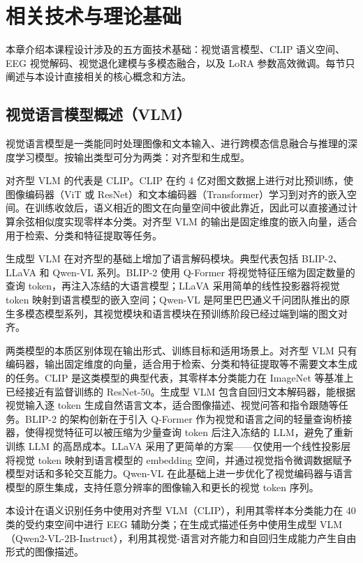 \section{相关技术与理论基础}

本章介绍本课程设计涉及的五方面技术基础：视觉语言模型、CLIP 语义空间、EEG 视觉解码、视觉退化建模与多模态融合，以及 LoRA 参数高效微调。每节只阐述与本设计直接相关的核心概念和方法。

\subsection{视觉语言模型概述（VLM）}

视觉语言模型是一类能同时处理图像和文本输入、进行跨模态信息融合与推理的深度学习模型。按输出类型可分为两类：对齐型和生成型。

对齐型 VLM 的代表是 CLIP。CLIP 在约 4 亿对图文数据上进行对比预训练，使图像编码器（ViT 或 ResNet）和文本编码器（Transformer）学习到对齐的嵌入空间。在训练收敛后，语义相近的图文在向量空间中彼此靠近，因此可以直接通过计算余弦相似度实现零样本分类。对齐型 VLM 的输出是固定维度的嵌入向量，适合用于检索、分类和特征提取等任务。

生成型 VLM 在对齐型的基础上增加了语言解码模块。典型代表包括 BLIP-2、LLaVA 和 Qwen-VL 系列。BLIP-2 使用 Q-Former 将视觉特征压缩为固定数量的查询 token，再注入冻结的大语言模型；LLaVA 采用简单的线性投影器将视觉 token 映射到语言模型的嵌入空间；Qwen-VL 是阿里巴巴通义千问团队推出的原生多模态模型系列，其视觉模块和语言模块在预训练阶段已经过端到端的图文对齐。

两类模型的本质区别体现在输出形式、训练目标和适用场景上。对齐型 VLM 只有编码器，输出固定维度的向量，适合用于检索、分类和特征提取等不需要文本生成的任务。CLIP 是这类模型的典型代表，其零样本分类能力在 ImageNet 等基准上已经接近有监督训练的 ResNet-50。生成型 VLM 包含自回归文本解码器，能根据视觉输入逐 token 生成自然语言文本，适合图像描述、视觉问答和指令跟随等任务。BLIP-2 的架构创新在于引入 Q-Former 作为视觉和语言之间的轻量查询桥接器，使得视觉特征可以被压缩为少量查询 token 后注入冻结的 LLM，避免了重新训练 LLM 的高昂成本。LLaVA 采用了更简单的方案——仅使用一个线性投影层将视觉 token 映射到语言模型的 embedding 空间，并通过视觉指令微调数据赋予模型对话和多轮交互能力。Qwen-VL 在此基础上进一步优化了视觉编码器与语言模型的原生集成，支持任意分辨率的图像输入和更长的视觉 token 序列。

本设计在语义识别任务中使用对齐型 VLM（CLIP），利用其零样本分类能力在 40 类的受约束空间中进行 EEG 辅助分类；在生成式描述任务中使用生成型 VLM（Qwen2-VL-2B-Instruct），利用其视觉-语言对齐能力和自回归生成能力产生自由形式的图像描述。


